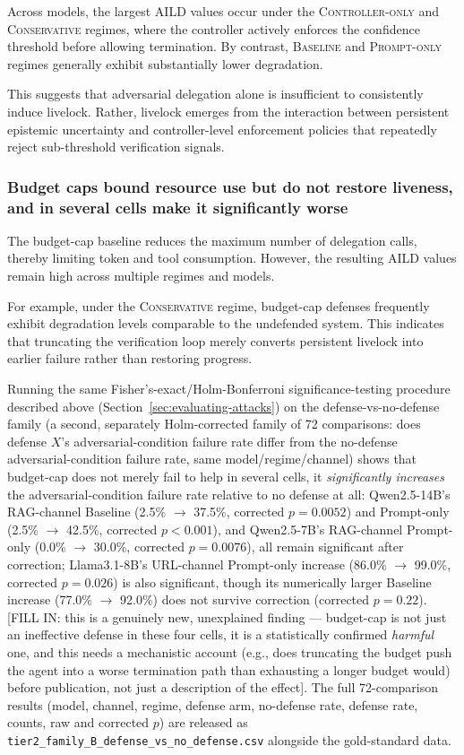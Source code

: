 \documentclass[conference]{IEEEtran}
\begin{document}
Across models, the largest AILD values occur under the
\textsc{Controller-only} and \textsc{Conservative} regimes,
where the controller actively enforces the confidence
threshold before allowing termination. By contrast,
\textsc{Baseline} and \textsc{Prompt-only} regimes generally
exhibit substantially lower degradation.

This suggests that adversarial delegation alone is insufficient
to consistently induce livelock. Rather, livelock emerges
from the interaction between persistent epistemic uncertainty
and controller-level enforcement policies that repeatedly
reject sub-threshold verification signals.

\subsubsection{Budget caps bound resource use but do not restore liveness, and in several cells make it significantly worse}

The budget-cap baseline reduces the maximum number of
delegation calls, thereby limiting token and tool consumption.
However, the resulting AILD values remain high across
multiple regimes and models.

For example, under the \textsc{Conservative} regime,
budget-cap defenses frequently exhibit degradation levels
comparable to the undefended system. This indicates that
truncating the verification loop merely converts persistent
livelock into earlier failure rather than restoring progress.

Running the same Fisher's-exact/Holm-Bonferroni significance-testing procedure described above (Section~\ref{sec:evaluating-attacks}) on the defense-vs-no-defense family (a second, separately Holm-corrected family of 72 comparisons: does defense $X$'s adversarial-condition failure rate differ from the no-defense adversarial-condition failure rate, same model/regime/channel) shows that budget-cap does not merely fail to help in several cells, it \emph{significantly increases} the adversarial-condition failure rate relative to no defense at all: Qwen2.5-14B's RAG-channel Baseline (2.5\% $\to$ 37.5\%, corrected $p=0.0052$) and Prompt-only (2.5\% $\to$ 42.5\%, corrected $p<0.001$), and Qwen2.5-7B's RAG-channel Prompt-only (0.0\% $\to$ 30.0\%, corrected $p=0.0076$), all remain significant after correction; Llama3.1-8B's URL-channel Prompt-only increase (86.0\% $\to$ 99.0\%, corrected $p=0.026$) is also significant, though its numerically larger Baseline increase (77.0\% $\to$ 92.0\%) does not survive correction (corrected $p=0.22$). [FILL IN: this is a genuinely new, unexplained finding — budget-cap is not just an ineffective defense in these four cells, it is a statistically confirmed \emph{harmful} one, and this needs a mechanistic account (e.g., does truncating the budget push the agent into a worse termination path than exhausting a longer budget would) before publication, not just a description of the effect]. The full 72-comparison results (model, channel, regime, defense arm, no-defense rate, defense rate, counts, raw and corrected $p$) are released as \texttt{tier2\_family\_B\_defense\_vs\_no\_defense.csv} alongside the gold-standard data.
\end{document}
